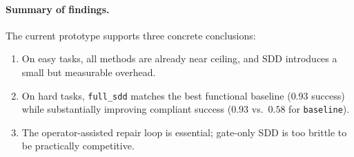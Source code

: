 \paragraph{Summary of findings.}
The current prototype supports three concrete conclusions:
\begin{enumerate}[leftmargin=*]
\item On easy tasks, all methods are already near ceiling, and SDD introduces a
small but measurable overhead.
\item On hard tasks, \texttt{full\_sdd} matches the best functional baseline
($0.93$ success) while substantially improving compliant success
($0.93$ vs.\ $0.58$ for \texttt{baseline}).
\item The operator-assisted repair loop is essential; gate-only SDD is too
brittle to be practically competitive.
\end{enumerate}
